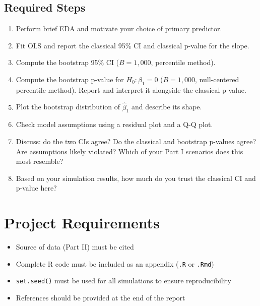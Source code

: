 \documentclass[12pt]{article}
\begin{document}
\subsection*{Required Steps}
\begin{enumerate}
    \item Perform brief EDA and motivate your choice of primary predictor.
    \item Fit OLS and report the classical 95\% CI and classical p-value for the slope.
    \item Compute the bootstrap 95\% CI ($B = 1{,}000$, percentile method).
    \item Compute the bootstrap p-value for $H_0\colon \beta_1 = 0$ ($B = 1{,}000$, null-centered percentile method). Report and interpret it alongside the classical p-value.
    \item Plot the bootstrap distribution of $\hat{\beta}_1$ and describe its shape.
    \item Check model assumptions using a residual plot and a Q-Q plot.
    \item Discuss: do the two CIs agree? Do the classical and bootstrap p-values agree? Are assumptions likely violated? Which of your Part I scenarios does this most resemble?
    \item Based on your simulation results, how much do you trust the classical CI and p-value here?
\end{enumerate}


\section*{Project Requirements}
\begin{itemize}
    \item Source of data (Part II) must be cited
    \item Complete R code must be included as an appendix (\texttt{.R} or \texttt{.Rmd})
    \item \texttt{set.seed()} must be used for all simulations to ensure reproducibility
    \item References should be provided at the end of the report
\end{itemize}
\end{document}
